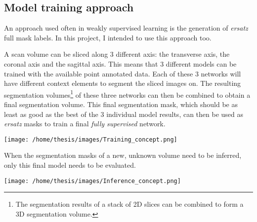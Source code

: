 \subsection{Model training approach}

An approach used often in weakly supervised learning is the generation of \textit{ersatz} full mask labels.
In this project, I intended to use this approach too.

A scan volume can be sliced along 3 different axis: the transverse axis, the coronal axis and the sagittal axis. 
This means that 3 different models can be trained with the available point annotated data. 
Each of these 3 networks will have different context elements to segment the sliced images on.
The resulting segmentation volumes\footnote{The segmentation results of a stack of 2D slices can be combined to form a 3D segmentation volume.} of these three networks can then be combined to obtain a final segmentation volume.
This final segmentation mask, which should be as least as good as the best of the 3 individual model results, can then be used as \textit{ersatz} masks to train a final \textit{fully supervised} network. 

\begin{SCfigure}[][htb]
    \centering
    \texttt{[image: /home/thesis/images/Training\_concept.png]}
    \caption{\label{fig:model_training_concept}Illustration of the model training approach. 
    This is based on the conbination of 3 different models based on different volume slices.}
\end{SCfigure}

When the segmentation masks of a new, unknown volume need to be inferred, only this final model needs to be evaluated.

\begin{SCfigure}[][htb]
    \centering
    \texttt{[image: /home/thesis/images/Inference\_concept.png]}
    \caption{Inference step. Only one model needs to be evaluated in this step, the model that is trianed in the final step of the training procedure illustrated in figure \ref{fig:model_training_concept}.}
\end{SCfigure}